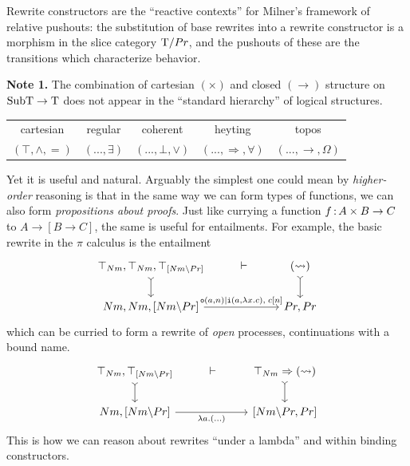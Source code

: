 \documentclass{article}
\begin{document}
Rewrite constructors are the ``reactive contexts'' for Milner's framework of relative pushouts: the substitution of base rewrites into a rewrite constructor is a morphism in the slice category $\mathrm{T}/Pr$, and the pushouts of these are the transitions which characterize behavior.




\vspace{1em}

\textbf{Note 1.} The combination of cartesian $(\times)$ and closed $(\to)$ structure on $\mathrm{SubT\to T}$ does not appear in the ``standard hierarchy'' of logical structures. \cite{elephant}

\begin{center}
    \begin{tabular}{c@{\qquad}c@{\qquad}c@{\qquad}c@{\qquad}c}
         cartesian & regular & coherent & heyting & topos\\
         $(\top,\land,=)$ & $(...,\exists)$ & $(...,\bot,\lor)$ & $(...,\Rightarrow,\forall)$ & $(...,\to,\Omega)$
    \end{tabular}
\end{center}
Yet it is useful and natural. Arguably the simplest one could mean by \textit{higher-order} reasoning is that in the same way we can form types of functions, we can also form \textit{propositions about proofs}. Just like currying a function $f\,{:}\, A\times B\to C$ to $A\to [B\to C]$, the same is useful for entailments.
For example, the basic rewrite in the $\pi$ calculus \cite{pi} is the entailment
\[\begin{tikzcd}
	{\top_{Nm},\top_{Nm},\top_{[Nm\lam Pr]}} & \vdash & {(\rsq)} \\
	{Nm,Nm,[Nm{\setminus}Pr]} && {Pr,Pr}
	\arrow[tail, from=1-1, to=2-1]
	\arrow[tail, from=1-3, to=2-3]
	\arrow["{\mtt{o}(a,n)|\mtt{i}(a,\lambda x.c),\; c[n]}", from=2-1, to=2-3]
\end{tikzcd}\]
which can be curried to form a rewrite of \textit{open} processes, continuations with a bound name.
\[\begin{tikzcd}
	{\top_{Nm},\top_{[Nm\lam Pr]}} & \vdash & {\top_{Nm}\ra (\rsq)} \\
	{Nm,[Nm{\setminus}Pr]} && {[Nm\lam Pr,Pr]}
	\arrow[tail, from=1-1, to=2-1]
	\arrow[tail, from=1-3, to=2-3]
	\arrow["{\lambda a.(...)}"', from=2-1, to=2-3]
\end{tikzcd}\]
This is how we can reason about rewrites ``under a lambda'' and within binding constructors.
\end{document}
